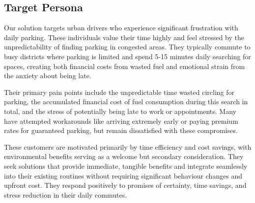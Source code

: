 \subsection{Target Persona}
Our solution targets urban drivers who experience significant frustration with daily parking. These individuals value their time highly and feel stressed by the unpredictability of finding parking in congested areas. They typically commute to busy districts where parking is limited and spend 5-15 minutes daily searching for spaces, creating both financial costs from wasted fuel and emotional strain from the anxiety about being late.

Their primary pain points include the unpredictable time wasted circling for parking, the accumulated financial cost of fuel consumption during this search in total, and the stress of potentially being late to work or appointments. Many have attempted workarounds like arriving extremely early or paying premium rates for guaranteed parking, but remain dissatisfied with these compromises.

These customers are motivated primarily by time efficiency and cost savings, with environmental benefits serving as a welcome but secondary consideration. They seek solutions that provide immediate, tangible benefits and integrate seamlessly into their existing routines without requiring significant behaviour changes and upfront cost. They respond positively to promises of certainty, time savings, and stress reduction in their daily commutes.


